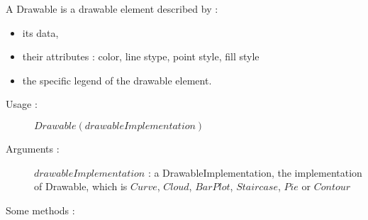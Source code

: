 A Drawable is a  drawable element described by :
\begin{itemize}
\item its data,
\item their attributes : color, line stype, point style, fill style
\item the specific legend of the drawable element.
\end{itemize}


\begin{description}
\item[Usage :] $Drawable(drawableImplementation)$

\item[Arguments :] $drawableImplementation$ : a DrawableImplementation, the implementation of  Drawable, which is $Curve$, $Cloud$, $BarPlot$, $Staircase$, $Pie$ or $Contour$

\item[Some methods :]  \rule{0pt}{1em}
  \begin{description}


\end{description}
\end{description}

